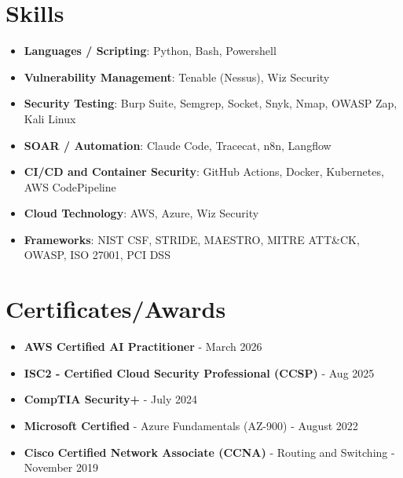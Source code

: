 \documentclass[letterpaper,11pt]{article}
\newcommand{\resumeSubHeadingListStart}{\begin{itemize}[leftmargin=*]}
\newcommand{\resumeSubHeadingListEnd}{\end{itemize}}
\begin{document}
\section{Skills}
 \resumeSubHeadingListStart
   \item{
     \textbf{Languages / Scripting}{: Python, Bash, Powershell}
   }
   \vspace{-8pt}
   \item{
     \textbf{Vulnerability Management}{: Tenable (Nessus), Wiz Security}
   }
   \vspace{-8pt}
   \item{
     \textbf{Security Testing}{: Burp Suite, Semgrep, Socket, Snyk, Nmap, OWASP Zap, Kali Linux}
   }
   \vspace{-8pt}
   \item{
     \textbf{SOAR / Automation}{: Claude Code, Tracecat, n8n, Langflow}
   }
   \vspace{-8pt}
   \item{
     \textbf{CI/CD and Container Security}{: GitHub Actions, Docker, Kubernetes, AWS CodePipeline}
   }
   \vspace{-8pt}
   \item{
     \textbf{Cloud Technology}{: AWS, Azure, Wiz Security}
   }
   \vspace{-8pt}
   \item{
     \textbf{Frameworks}{: NIST CSF, STRIDE, MAESTRO, MITRE ATT\&CK, OWASP, ISO 27001, PCI DSS}
   }
   
 \resumeSubHeadingListEnd


\section{Certificates/Awards}
  \resumeSubHeadingListStart
    \item{\textbf{AWS Certified AI Practitioner} - March 2026} \vspace{-8pt}
    \item{\textbf{ISC2 - Certified Cloud Security Professional (CCSP)} - Aug 2025} \vspace{-8pt}
    \item{\textbf{CompTIA Security+} - July 2024} \vspace{-8pt}
    \item{\textbf{Microsoft Certified} - Azure Fundamentals (AZ-900) - August 2022} \vspace{-8pt}
    \item{\textbf{Cisco Certified Network Associate (CCNA)} - Routing and Switching - November 2019} \vspace{-8pt}
  \resumeSubHeadingListEnd
\end{document}
